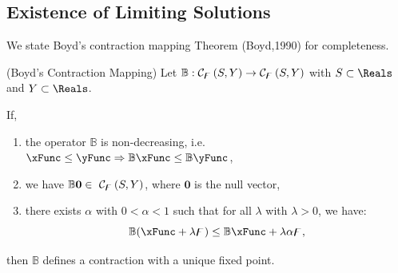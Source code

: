 \documentclass[\econtexRoot/BufferStockTheory]{subfiles}
\begin{document}
\hypertarget{It-Is-A-Contraction-Mapping}{}
\subsection{Existence of Limiting Solutions}\label{sec:Tcontractionmapping}



We state Boyd's contraction mapping Theorem (Boyd,1990) for completeness.

\begin{theorem}(Boyd's Contraction Mapping)\label{thm:Boyd}
Let $\mathbb{B}:\mathcal{C}_{\digamma }\left( S,Y\right)
  \rightarrow \mathcal{C}_{\digamma }\left(S,Y\right) $ with $S\subset \Reals$ and $Y\subset \Reals$.

If, 
\begin{enumerate}
  \item the operator $\mathbb{B}$ is non-decreasing, i.e.\ $\xFunc \leq \yFunc \Rightarrow\mathbb{B}{\xFunc } \leq \mathbb{B}{\yFunc}$,
  \item we have $\mathbb{B}\mathbf{0}\in ~ \mathcal{C}_{\digamma }\left(S,Y\right) $, where $\mathbf{0}$ is the null vector,
  \item there exists $\alpha$ with $0 < \alpha < 1$ such that for all $\lambda$ with $\lambda > 0$, we have:
             $$\mathbb{B}({\xFunc } +\lambda\boundFunc ) \leq \mathbb{B}{\xFunc } +\lambda\alpha \boundFunc,$$
\end{enumerate}
then $\mathbb{B}$ defines a contraction with a unique fixed point.
\end{theorem}
\end{document}
